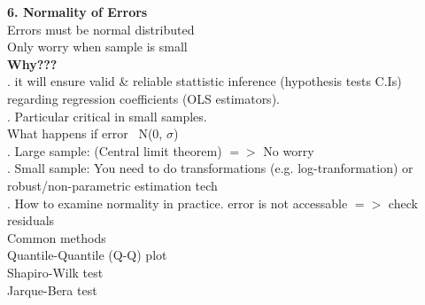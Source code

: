 \documentclass{article}
\begin{document}
\indent \textbf{6. Normality of Errors}\\
\indent \indent Errors must be normal distributed\\
\indent \indent Only worry when sample is small\\
\indent \indent \textbf{Why???}\\
\indent \indent {}. it will ensure valid \& reliable stattistic inference (hypothesis tests C.Is) regarding regression coefficients (OLS estimators).\\
\indent \indent {}. Particular critical in small samples.\\
\indent \indent \indent What happens if error ~N(0, $\sigma$)\\
\indent \indent \indent {}. Large sample: (Central limit theorem) $=>$ No worry\\
\indent \indent \indent {}. Small sample: You need to do transformations (e.g. log-tranformation) or robust/non-parametric estimation tech\\
\indent \indent \indent {}. How to examine normality in practice. error is not accessable $=>$ check residuals\\
\indent \indent \indent \indent \indent Common methods\\
\indent \indent \indent \indent \indent \indent * Quantile-Quantile (Q-Q) plot\\
\indent \indent \indent \indent \indent \indent * Shapiro-Wilk test\\
\indent \indent \indent \indent \indent \indent * Jarque-Bera test\\
\end{document}
